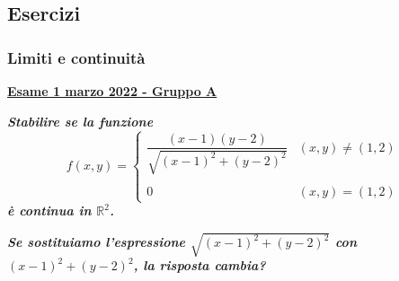 \documentclass[a4paper]{article}
\newcommand{\definition}[1]{\textcolor{Red3}{\textbf{#1}}}
\newcommand{\example}[1]{\textcolor{Green4}{\textbf{#1}}}
\begin{document}
	\newpage
	\newpage
	\newpage
	\subsection{Esercizi}

	\subsubsection{Limiti e continuità}

	\begin{flushleft}\label{exam: esame 01 marzo 2022 - Gruppo A - 4 esercizio}
		\definition{\underline{Esame 1 marzo 2022 - Gruppo A}}
	\end{flushleft}
	\example{\emph{Stabilire se la funzione}
	\begin{equation*}
		f\left(x,y\right) = \begin{cases}
			\dfrac{\left(x-1\right)\left(y-2\right)}{\sqrt{\left(x-1\right)^{2} + \left(y-2\right)^{2}}} & \left(x,y\right) \ne \left(1,2\right) \\
			\\
			0 & \left(x,y\right) = \left(1,2\right)
		\end{cases}
	\end{equation*}
	\emph{è continua in $\mathbb{R}^{2}$.}}
	
	\noindent
	\example{\emph{Se sostituiamo l'espressione $\sqrt{\left(x-1\right)^{2} + \left(y-2\right)^{2}}$ con $\left(x-1\right)^{2} + \left(y-2\right)^{2}$, la risposta cambia?}}\newline
\end{document}
